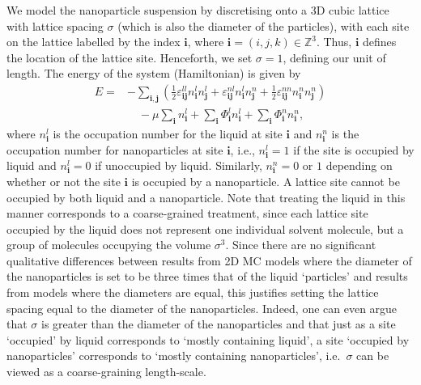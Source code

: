 \documentclass[journal=langd5,manuscript=article]{achemso}
\def\i{\mathbf{i}}
\def\j{\mathbf{j}}
\def\e{\varepsilon}
\begin{document}
We model the nanoparticle suspension by discretising onto a 3D cubic lattice with lattice spacing $\sigma$ (which is also the diameter of the particles), with each site on the lattice labelled by the index $\i$, where $\i=(i,j,k)\in \mathbb{Z}^3$. Thus, $\i$ defines the location of the lattice site. Henceforth, we set $\sigma = 1$, defining our unit of length. The energy of the system (Hamiltonian) is given by
%
\begin{equation}
  \begin{aligned}
  E =& - \sum_{\i,\j} \left(
      \frac12 \e^{ll}_{\i\j}n^l_{\i}n^l_{\j}
    + \e^{nl}_{\i\j} n^l_{\i}n^n_{\j}
    + \frac12 \e^{nn}_{\i\j} n^n_{\i}n^n_{\j}
  \right)\\
 &\quad - \mu\sum_{\i} n^l_{\i}
  + \sum_{\i} \Phi_{\i}^l n^l_{\i}
  + \sum_{\i} \Phi_{\i}^n n^n_{\i},
\end{aligned}
\label{eq:mc-hamiltonian}
\end{equation}
%
where $n^l_\i$ is the occupation number for the liquid at site $\i$ and
$n^n_\i$ is the occupation number for nanoparticles at site $\i$,
i.e., $n^l_\i = 1$ if the site is occupied by liquid and $n^l_\i=0$ if
unoccupied by liquid. Similarly, $n^n_\i = 0$ or $1$ depending on
whether or not the site $\i$ is occupied by a nanoparticle. A lattice site
cannot be occupied by both liquid and a nanoparticle. {Note
that treating the liquid in this manner corresponds to a
coarse-grained treatment, since each lattice site occupied by the
liquid does not
represent one individual solvent molecule, but a group of molecules
occupying the volume $\sigma^3$. Since there are no significant qualitative differences between results from 2D MC models where the diameter of the nanoparticles is set to be three times that of the liquid `particles' and results from models where the diameters are equal,\cite{blunt2010patterns, rabani2003, pauliac2008, vancea08, stannard2011dewetting, vancea2011pattern} this justifies setting the lattice spacing equal to the diameter of the nanoparticles. Indeed, one can even argue that $\sigma$ is greater than the diameter of the nanoparticles and that just as a site `occupied' by liquid corresponds to `mostly containing liquid', a site `occupied by nanoparticles' corresponds to `mostly containing nanoparticles', i.e.\ $\sigma$ can be viewed as a coarse-graining length-scale.\cite{chalmers2017}}
\end{document}
